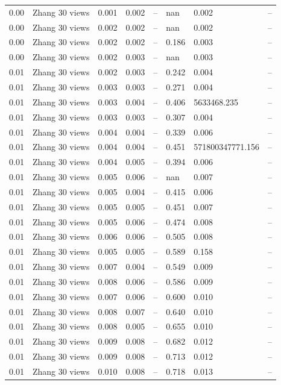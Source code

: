 \begin{table}[H]
\begin{tabular}{l c l l l}
0.00 & Zhang 30 views & 0.001 & 0.002 & -- & nan & 0.002 & -- \\
0.00 & Zhang 30 views & 0.002 & 0.002 & -- & nan & 0.002 & -- \\
0.00 & Zhang 30 views & 0.002 & 0.002 & -- & 0.186 & 0.003 & -- \\
0.00 & Zhang 30 views & 0.002 & 0.003 & -- & nan & 0.003 & -- \\
0.01 & Zhang 30 views & 0.002 & 0.003 & -- & 0.242 & 0.004 & -- \\
0.01 & Zhang 30 views & 0.003 & 0.003 & -- & 0.271 & 0.004 & -- \\
0.01 & Zhang 30 views & 0.003 & 0.004 & -- & 0.406 & 5633468.235 & -- \\
0.01 & Zhang 30 views & 0.003 & 0.003 & -- & 0.307 & 0.004 & -- \\
0.01 & Zhang 30 views & 0.004 & 0.004 & -- & 0.339 & 0.006 & -- \\
0.01 & Zhang 30 views & 0.004 & 0.004 & -- & 0.451 & 571800347771.156 & -- \\
0.01 & Zhang 30 views & 0.004 & 0.005 & -- & 0.394 & 0.006 & -- \\
0.01 & Zhang 30 views & 0.005 & 0.006 & -- & nan & 0.007 & -- \\
0.01 & Zhang 30 views & 0.005 & 0.004 & -- & 0.415 & 0.006 & -- \\
0.01 & Zhang 30 views & 0.005 & 0.005 & -- & 0.451 & 0.007 & -- \\
0.01 & Zhang 30 views & 0.005 & 0.006 & -- & 0.474 & 0.008 & -- \\
0.01 & Zhang 30 views & 0.006 & 0.006 & -- & 0.505 & 0.008 & -- \\
0.01 & Zhang 30 views & 0.005 & 0.005 & -- & 0.589 & 0.158 & -- \\
0.01 & Zhang 30 views & 0.007 & 0.004 & -- & 0.549 & 0.009 & -- \\
0.01 & Zhang 30 views & 0.008 & 0.006 & -- & 0.586 & 0.009 & -- \\
0.01 & Zhang 30 views & 0.007 & 0.006 & -- & 0.600 & 0.010 & -- \\
0.01 & Zhang 30 views & 0.008 & 0.007 & -- & 0.640 & 0.010 & -- \\
0.01 & Zhang 30 views & 0.008 & 0.005 & -- & 0.655 & 0.010 & -- \\
0.01 & Zhang 30 views & 0.009 & 0.008 & -- & 0.682 & 0.012 & -- \\
0.01 & Zhang 30 views & 0.009 & 0.008 & -- & 0.713 & 0.012 & -- \\
0.01 & Zhang 30 views & 0.010 & 0.008 & -- & 0.718 & 0.013 & -- \\

\end{tabular}
\end{table}

